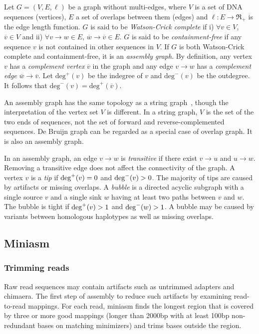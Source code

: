 \documentclass{bioinfo}
\begin{document}
\begin{methods}
Let $G=(V,E,\ell)$ be a graph without multi-edges, where $V$ is a
set of DNA sequences (vertices), $E$ a set of overlaps between them (edges) and
$\ell:E\to\Re_+$ is the edge length function. $G$ is said to be
\emph{Watson-Crick complete} if i) $\forall v\in V$, $\overline{v}\in V$ and
ii) $\forall v\to w\in E$, $\overline{w}\to\overline{v}\in E$. $G$ is said to
be \emph{containment-free} if any sequence $v$ is not contained in other
sequences in $V$. If $G$ is both Watson-Crick complete and containment-free, it
is an \emph{assembly graph}. By definition, any vertex $v$ has a
\emph{complement vertex} $\overline{v}$ in the graph and any edge $v\to w$ has
a \emph{complement edge} $\overline{w}\to\overline{v}$.  Let
$\mathrm{deg}^+(v)$ be the indegree of $v$ and $\mathrm{deg}^-(v)$ be the
outdegree. It follows that $\mathrm{deg}^-(v)=\mathrm{deg}^+(\overline{v})$.

An assembly graph has the same topology as a string graph~\citep{Myers:2005bh},
though the interpretation of the vertex set $V$ is different. In a string
graph, $V$ is the set of the two ends of sequences, not the set of forward and
reverse-complemented sequences. De Bruijn graph can be regarded as a special
case of overlap graph. It is also an assembly graph.

In an assembly graph, an edge $v\to w$ is \emph{transitive} if there exist
$v\to u$ and $u\to w$. Removing a transitive edge does not affect the
connectivity of the graph. A vertex $v$ is a \emph{tip} if ${\rm deg}^+(v)=0$
and ${\rm deg}^-(v)>0$. The majority of tips are caused by artifacts or missing
overlaps. A \emph{bubble} is a directed acyclic subgraph with a single source
$v$ and a single sink $w$ having at least two paths between $v$ and $w$. The
bubble is tight if ${\rm deg}^+(v)>1$ and ${\rm deg}^-(w)>1$. A bubble may be
caused by variants between homologous haplotypes as well as missing overlaps.

\subsection{Miniasm}

\subsubsection{Trimming reads}

Raw read sequences may contain artifacts such as untrimmed adapters and
chimaera. The first step of assembly to reduce such artifacts by examining
read-to-read mappings. For each read, miniasm finds the longest region that is
covered by three or more good mappings (longer than 2000bp with at least 100bp
non-redundant bases on matching minimizers) and trims bases outside the region.


\end{methods}
\end{document}
